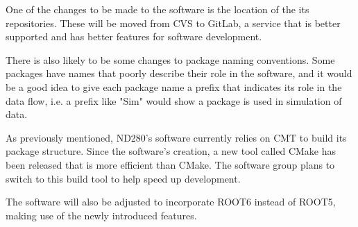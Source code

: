 \documentclass[aps,pra,12pt,notitlepage,tightenlines]{revtex4-1}
\begin{document}
One of the changes to be made to the software is the location of the its repositories. These will be moved from CVS to GitLab, a service that is better supported and has better features for software development.

There is also likely to be some changes to package naming conventions. Some packages have names that poorly describe their role in the software, and it would be a good idea to give each package name a prefix that indicates its role in the data flow, i.e. a prefix like "Sim" would show a package is used in simulation of data.

As previously mentioned, ND280's software currently relies on CMT to build its package structure. Since the software's creation, a new tool called CMake has been released that is more efficient than CMake. The software group plans to switch to this build tool to help speed up development.

The software will also be adjusted to incorporate ROOT6 instead of ROOT5, making use of the newly introduced features.
\end{document}
